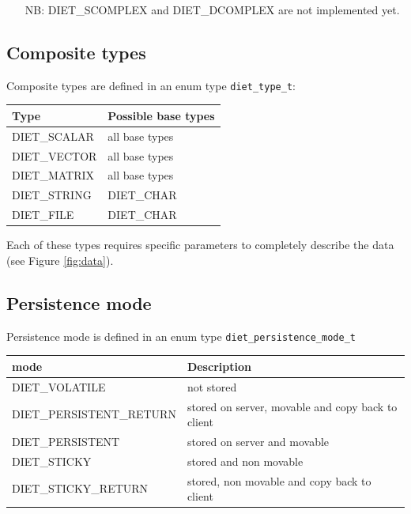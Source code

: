 \begin{itemize}
\item[NB:] \textsf{DIET\_SCOMPLEX} and \textsf{DIET\_DCOMPLEX} are not implemented yet.
\end{itemize}


\subsection{Composite types}
\label{ssec:complex}

Composite types are defined in an enum type \texttt{diet\_type\_t}:
\begin{center}
\footnotesize
\begin{tabular}{|l|l|}
\hline
\textbf{Type}&\textbf{Possible base types}\\
\hline
\textsf{DIET\_SCALAR} & all base types\\
\textsf{DIET\_VECTOR} & all base types\\
\textsf{DIET\_MATRIX} & all base types\\
\textsf{DIET\_STRING} & \textsf{DIET\_CHAR}\\
\textsf{DIET\_FILE}   & \textsf{DIET\_CHAR}\\
\hline
\end{tabular}
\end{center}

Each of these types requires specific parameters to completely describe the
data (see Figure \ref{fig:data}).


\subsection{Persistence mode}
\label{ssec:persismode}
Persistence mode is defined in an enum type \texttt{diet\_persistence\_mode\_t}

\begin{center}
\footnotesize
\begin{tabular}{|l|l|}
\hline
\textbf{mode}&\textbf{Description}\\
\hline
\textsf{DIET\_VOLATILE} & not stored\\
\textsf{DIET\_PERSISTENT\_RETURN} & stored on server, movable and copy back to client\\
\textsf{DIET\_PERSISTENT} & stored on server and movable\\
\textsf{DIET\_STICKY} & stored and non movable\\
\hline\hline
\textsf{DIET\_STICKY\_RETURN} & stored, non movable and copy back to client\\
\hline
\end{tabular}
\end{center}

